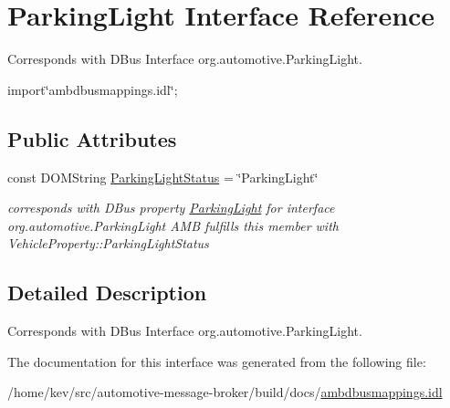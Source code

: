 \hypertarget{interfaceParkingLight}{\section{Parking\+Light Interface Reference}
\label{interfaceParkingLight}
}


Corresponds with D\+Bus Interface org.\+automotive.\+Parking\+Light.  




{\ttfamily import\char`\"{}ambdbusmappings.\+idl\char`\"{};}

\subsection*{Public Attributes}
\begin{DoxyCompactItemize}
\item 
\hypertarget{interfaceParkingLight_a2f2441de52369f858974a311cfab4c30}{const D\+O\+M\+String \hyperlink{interfaceParkingLight_a2f2441de52369f858974a311cfab4c30}{Parking\+Light\+Status} = \char`\"{}Parking\+Light\char`\"{}}\label{interfaceParkingLight_a2f2441de52369f858974a311cfab4c30}

\begin{DoxyCompactList}\small\item\em corresponds with D\+Bus property \hyperlink{interfaceParkingLight}{Parking\+Light} for interface org.\+automotive.\+Parking\+Light A\+M\+B fulfills this member with Vehicle\+Property\+::\+Parking\+Light\+Status \end{DoxyCompactList}\end{DoxyCompactItemize}


\subsection{Detailed Description}
Corresponds with D\+Bus Interface org.\+automotive.\+Parking\+Light. 

The documentation for this interface was generated from the following file\+:\begin{DoxyCompactItemize}
\item 
/home/kev/src/automotive-\/message-\/broker/build/docs/\hyperlink{ambdbusmappings_8idl}{ambdbusmappings.\+idl}\end{DoxyCompactItemize}
